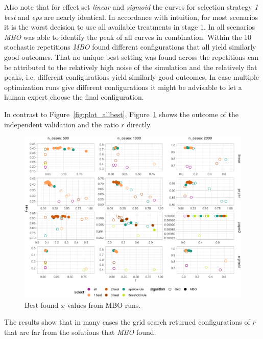 \documentclass[bimj,fleqn]{w-art}
\theoremstyle{plain}
\theoremstyle{definition}
\begin{document}
Also note that for effect set \emph{linear} and \emph{sigmoid} the curves for selection strategy \emph{1 best} and \emph{eps} are nearly identical.
In accordance with intuition, for most scenarios it is the worst decision to use all available treatments in stage 1. 
In all scenarios \emph{MBO} was able to identify the peak of all curves in combination.
Within the 10 stochastic repetitions \emph{MBO} found different configurations that all yield similarly good outcomes.
That no unique best setting was found across the repetitions can be attributed to the relatively high noise of the simulation and the relatively flat peaks, i.e. different configurations yield similarly good outcomes.
In case multiple optimization runs give different configurations it might be advisable to let a human expert choose the final configuration.

In contrast to Figure~\ref{fig:plot_allbest}, Figure~\ref{fig:plot_best_x} shows the outcome of the independent validation and the ratio $r$ directly.
\begin{figure}[htb]
\centering
\includegraphics[width=\linewidth]{generated/figures/plot_best_x.pdf}
\caption{Best found $x$-values from MBO runs.}
\label{fig:plot_best_x}
\end{figure}
The results show that in many cases the grid search returned configurations of $r$ that are far from the solutions that \emph{MBO} found. 
\end{document}
